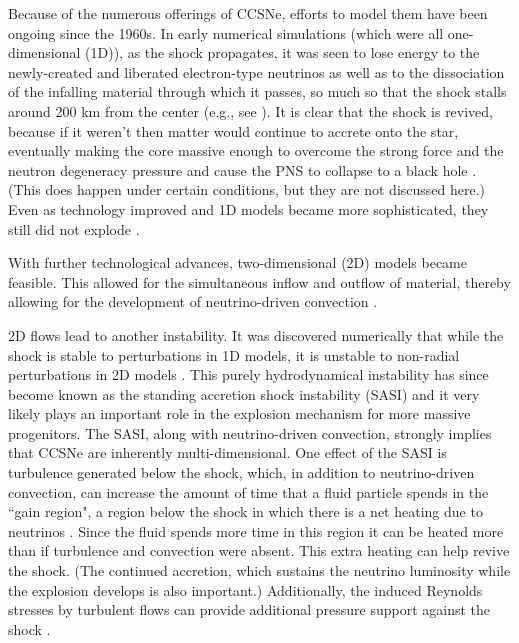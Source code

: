 Because of the numerous offerings of CCSNe, efforts to model them have been
ongoing since the 1960s.
In early numerical simulations (which were all one-dimensional (1D)),
as the shock propagates,
it was seen to lose energy to the newly-created and liberated
electron-type neutrinos as well as to the dissociation of the
infalling material through which it passes,
so much so that the shock stalls around 200 km from the center
(e.g., see \citet{hm1981}).
It is clear that the shock is revived, because if it weren't then matter
would continue to accrete onto the star, eventually making the core massive
enough to overcome the strong force and the neutron degeneracy pressure
and cause the PNS to collapse
to a black hole \citep{bw1985}.
(This does happen under certain conditions, but they are not discussed here.)
Even as technology improved and 1D
models became more sophisticated, they still did not explode
\citep[e.g., see][]{%
cj1960,
mw1966,
cw1966,
r1979,
hm1981,
bw1985,
mim1991,
mb1993,
mb1993a,
mb1993b,
rj2000,
mlm2001,
rj2002,
twi2003,
tbp2003,
lmm2004,
kjh2006,
sys2007,
zwh2008,
hmj2010,
thr2017,
sro2019,
bmo2021,
gmm2023%
}.

With further technological advances, two-dimensional (2D) models
became feasible.
This allowed for the simultaneous inflow and outflow of material,
thereby allowing for the development of neutrino-driven convection
\citep[e.g., see][]{%
hbc1992,
sys1993,
jm1995,
jm1995a,
mcb1998,
kpj2003,
kjh2006,
sjf2008,
fkh2011,
mm2011,
mjw2012,
tks2012,
mdb2013,
roa2016,
gmm2023%
}.

2D flows lead to another instability.
It was discovered numerically that while the shock is stable to
perturbations in 1D models, it is unstable to non-radial perturbations
in 2D models \citep{bmd2003}.
This purely hydrodynamical instability has since become known as the
standing accretion shock instability (SASI) and it very likely plays an
important role in the explosion mechanism for more massive progenitors.
The SASI, along with neutrino-driven convection, strongly implies that
CCSNe are inherently multi-dimensional.
One effect of the SASI is turbulence generated below the shock,
which, in addition to neutrino-driven convection,
can increase the amount of time that a fluid particle spends
in the ``gain region", a region below the shock in which there is a
net heating due to neutrinos \citep{co2015}.
Since the fluid spends more time in this region it can be heated more than if
turbulence and convection were absent.
This extra heating can help revive the shock.
(The continued accretion, which sustains the neutrino luminosity while the
explosion develops is also important.)
Additionally, the induced Reynolds stresses by turbulent flows can provide additional
pressure support against the shock \citep[e.g., see][]{mm2018}.

